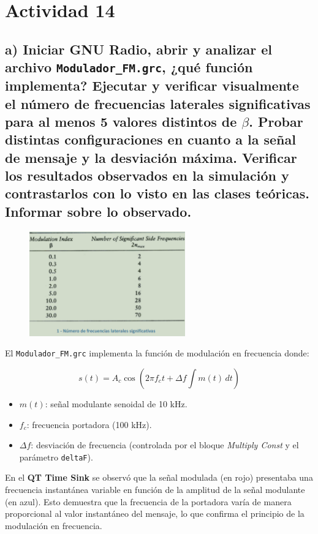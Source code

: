 \section{Actividad 14}

\subsection*{a) Iniciar GNU Radio, abrir y analizar el archivo \texttt{Modulador\_FM.grc}, ¿qué función implementa? Ejecutar y verificar visualmente el número de frecuencias laterales significativas para al menos 
5 valores distintos de $\beta$. Probar distintas configuraciones en cuanto a la señal de mensaje y la desviación máxima. Verificar los resultados observados en la simulación y contrastarlos con lo visto en las clases teóricas. Informar sobre lo observado.}

      \begin{figure}[H]
        \centering
        \includegraphics[width=0.6\textwidth]{imagenes/Parte_2/Actividad_14/fig6.png}
        \label{fig:6}
     \end{figure}

El \texttt{Modulador\_FM.grc} implementa la función de modulación en frecuencia donde:

    \[
        s(t) = A_c \cos \left( 2 \pi f_c t + \Delta f \int m(t) \, dt \right)
    \]

\begin{itemize}
    \item $m(t)$: señal modulante senoidal de 10 kHz.
    \item $f_c$: frecuencia portadora (100 kHz).
    \item $\Delta f$: desviación de frecuencia (controlada por el bloque \textit{Multiply Const} y el parámetro \texttt{deltaF}).
\end{itemize}

En el \textbf{QT Time Sink} se observó que la señal modulada (en rojo) presentaba una frecuencia instantánea variable en función de la amplitud de la señal modulante (en azul). Esto demuestra que la frecuencia de la portadora varía de manera proporcional al valor instantáneo del mensaje, lo que confirma el principio de la modulación en frecuencia.

